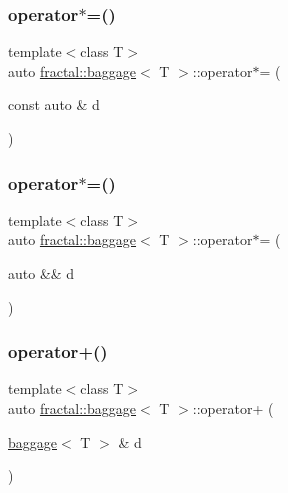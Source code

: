 \mbox{\label{classfractal_1_1baggage_ac2a20d1eee27b24b907c33aacc1e0d0e}} 
\subsubsection{\texorpdfstring{operator$\ast$=()}{operator*=()}\hspace{0.1cm}{\footnotesize\ttfamily [2/3]}}
{\footnotesize\ttfamily template$<$class T$>$ \\
auto \hyperlink{classfractal_1_1baggage}{fractal\+::baggage}$<$ T $>$\+::operator$\ast$= (\begin{DoxyParamCaption}\item[{const auto \&}]{d }\end{DoxyParamCaption})\hspace{0.3cm}{\ttfamily [inline]}}

\mbox{\label{classfractal_1_1baggage_a13ad7848ea0bf14f49efc96149d95261}} 
\subsubsection{\texorpdfstring{operator$\ast$=()}{operator*=()}\hspace{0.1cm}{\footnotesize\ttfamily [3/3]}}
{\footnotesize\ttfamily template$<$class T$>$ \\
auto \hyperlink{classfractal_1_1baggage}{fractal\+::baggage}$<$ T $>$\+::operator$\ast$= (\begin{DoxyParamCaption}\item[{auto \&\&}]{d }\end{DoxyParamCaption})\hspace{0.3cm}{\ttfamily [inline]}}

\mbox{\label{classfractal_1_1baggage_a7e5735728eece548c425b12e45bb76ed}} 
\subsubsection{\texorpdfstring{operator+()}{operator+()}\hspace{0.1cm}{\footnotesize\ttfamily [1/3]}}
{\footnotesize\ttfamily template$<$class T$>$ \\
auto \hyperlink{classfractal_1_1baggage}{fractal\+::baggage}$<$ T $>$\+::operator+ (\begin{DoxyParamCaption}\item[{\hyperlink{classfractal_1_1baggage}{baggage}$<$ T $>$ \&}]{d }\end{DoxyParamCaption})\hspace{0.3cm}{\ttfamily [inline]}}

